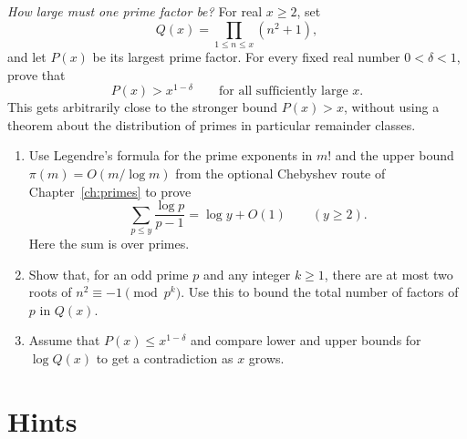 \begin{exercise}[$\star\star\star$]\label{pb:nsq1}
\emph{How large must one prime factor be?}
For real $x\ge2$, set
\[
Q(x)=\prod_{1\le n\le x}(n^2+1),
\]
and let $P(x)$ be its largest prime factor.
For every fixed real number $0<\delta<1$, prove that
\[
P(x)>x^{1-\delta}
\qquad\text{for all sufficiently large }x.
\]
This gets arbitrarily close to the stronger bound $P(x)>x$,
without using a theorem about the distribution of primes
in particular remainder classes.

\begin{enumerate}[label=(\alph*)]
\item Use Legendre's formula for the prime exponents in $m!$
and the upper bound $\pi(m)=O(m/\log m)$ from the
optional Chebyshev route of Chapter~\ref{ch:primes}
to prove
\[
\sum_{p\le y}\frac{\log p}{p-1}=\log y+O(1)
\qquad(y\ge2).
\]
Here the sum is over primes.
\item Show that, for an odd prime $p$ and any integer $k\ge1$,
there are at most two roots of
$n^2\equiv-1\pmod{p^k}$.
Use this to bound the total number of factors of $p$
in $Q(x)$.
\item Assume that $P(x)\le x^{1-\delta}$ and compare
lower and upper bounds for $\log Q(x)$ to get a
contradiction as $x$ grows.
\end{enumerate}
\end{exercise}

\section{Hints}

